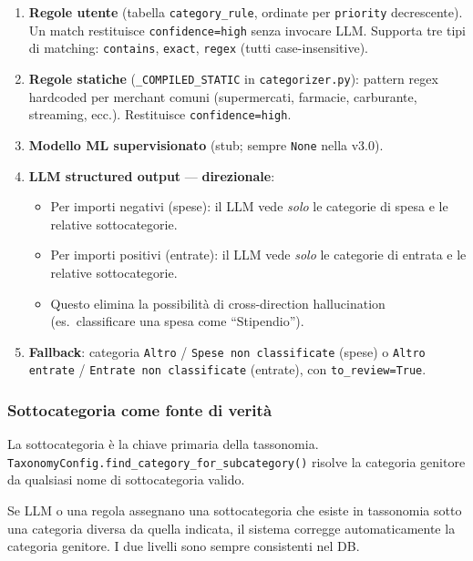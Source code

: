 \documentclass[11pt, a4paper]{article}
\begin{document}
\begin{enumerate}[leftmargin=2em, label=\textbf{Step \arabic*.}]
  \item \textbf{Regole utente} (tabella \texttt{category\_rule}, ordinate per
        \texttt{priority} decrescente). Un match restituisce \texttt{confidence=high}
        senza invocare LLM. Supporta tre tipi di matching: \texttt{contains},
        \texttt{exact}, \texttt{regex} (tutti case-insensitive).
  \item \textbf{Regole statiche} (\texttt{\_COMPILED\_STATIC} in \texttt{categorizer.py}):
        pattern regex hardcoded per merchant comuni (supermercati, farmacie, carburante,
        streaming, ecc.). Restituisce \texttt{confidence=high}.
  \item \textbf{Modello ML supervisionato} (stub; sempre \texttt{None} nella v3.0).
  \item \textbf{LLM structured output} --- \textbf{direzionale}:
        \begin{itemize}
          \item Per importi negativi (spese): il LLM vede \emph{solo} le categorie
                di spesa e le relative sottocategorie.
          \item Per importi positivi (entrate): il LLM vede \emph{solo} le categorie
                di entrata e le relative sottocategorie.
          \item Questo elimina la possibilità di cross-direction hallucination
                (es.\ classificare una spesa come ``Stipendio'').
        \end{itemize}
  \item \textbf{Fallback}: categoria \texttt{Altro} / \texttt{Spese non classificate}
        (spese) o \texttt{Altro entrate} / \texttt{Entrate non classificate} (entrate),
        con \texttt{to\_review=True}.
\end{enumerate}

\subsubsection{Sottocategoria come fonte di verità}

\begin{newbox}
La sottocategoria è la chiave primaria della tassonomia.
\texttt{TaxonomyConfig.find\_category\_for\_subcategory()} risolve la categoria
genitore da qualsiasi nome di sottocategoria valido.

Se LLM o una regola assegnano una sottocategoria che esiste in tassonomia sotto una
categoria diversa da quella indicata, il sistema corregge automaticamente la categoria
genitore. I due livelli sono sempre consistenti nel DB.
\end{newbox}
\end{document}
